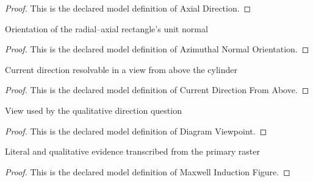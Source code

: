 \begin{proof}
  This is the declared model definition of Axial Direction.
\end{proof}
\begin{definition}
  \label{def:physics:phyx-mini-0983:phyxminiproblems-problemphyxmini0983-azimuthalnormalorientation}
  Orientation of the radial--axial rectangle's unit normal
\end{definition}
\begin{proof}
  This is the declared model definition of Azimuthal Normal Orientation.
\end{proof}
\begin{definition}
  \label{def:physics:phyx-mini-0983:phyxminiproblems-problemphyxmini0983-currentdirectionfromabove}
  Current direction resolvable in a view from above the cylinder
\end{definition}
\begin{proof}
  This is the declared model definition of Current Direction From Above.
\end{proof}
\begin{definition}
  \label{def:physics:phyx-mini-0983:phyxminiproblems-problemphyxmini0983-diagramviewpoint}
  View used by the qualitative direction question
\end{definition}
\begin{proof}
  This is the declared model definition of Diagram Viewpoint.
\end{proof}
\begin{definition}
  \label{def:physics:phyx-mini-0983:phyxminiproblems-problemphyxmini0983-maxwellinductionfigure}
  Literal and qualitative evidence transcribed from the primary raster
\end{definition}
\begin{proof}
  This is the declared model definition of Maxwell Induction Figure.
\end{proof}
